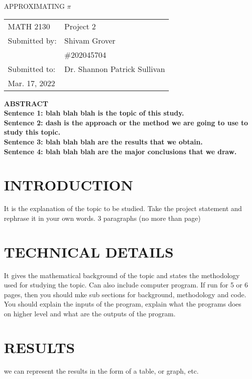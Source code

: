 \documentclass[12pt]{article}
\begin{document}
\begin{titlepage}
\begin{center}
\large APPROXIMATING $\displaystyle \pi$
\end{center}
\vspace{6cm}
\hfill\begin{tabular}{ll}
MATH 2130 & Project 2 \\
Submitted by: & Shivam Grover \\
& \#202045704 \\
Submitted to: & Dr. Shannon Patrick Sullivan \\
Mar. 17, 2022

\end{tabular}
\end{titlepage}

\bf{ABSTRACT} \\
Sentence 1: blah blah blah is the topic of this study.\\
Sentence 2: dash is the approach or the method we are going to use to study this topic.\\
Sentence 3: blah blah blah are the results that we obtain.\\
Sentence 4: blah blah blah are the major conclusions that we draw.\\

\section {INTRODUCTION}
It is the explanation of the topic to be studied. Take the project statement and rephrase it in your own words. 3 paragraphs (no more than  page)


\section {TECHNICAL DETAILS}
It gives the mathematical background of the topic and states the methodology used for studying the topic. Can also include computer program. If run for 5 or 6 pages, then you should mke sub sections for background, methodology and code. You should explain the inputs of the program, explain what the programs does on higher level and what are the outputs of the program.

\section {RESULTS}
we can represent the results in the form of a table, or graph, etc.
\end{document}

